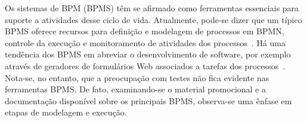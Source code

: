 \documentclass[12pt]{article}
\begin{document}


Os sistemas de BPM (BPMS) têm se afirmado como ferramentas essenciais para suporte a atividades desse ciclo de vida. Atualmente, pode-se dizer que um típico BPMS oferece recursos para definição e modelagem de processos em BPMN, controle da execução e monitoramento de atividades dos processos~\cite{forrester}. Há uma tendência dos BPMS em abreviar o desenvolvimento de software, por exemplo através de geradores de formulários Web associados a tarefas dos processos~\cite{greenresearch}. Nota-se, no entanto, que a preocupação com testes não fica evidente nas ferramentas BPMS. De fato, examinando-se o material promocional e a documentação disponível sobre os principais BPMS, observa-se uma ênfase em etapas de modelagem e execução.

\end{document}
